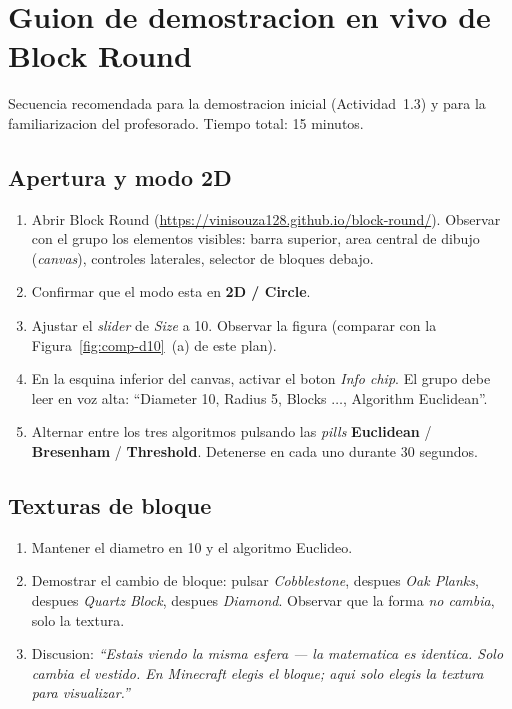 \documentclass[12pt,a4paper]{scrartcl}
\newcommand{\acc}[1]{\textcolor{accent}{\textbf{#1}}}
\begin{document}
\section{Guion de demostracion en vivo de Block Round}\label{ap:roteiro}

Secuencia recomendada para la demostracion inicial (Actividad~1.3) y para la familiarizacion del profesorado. Tiempo total: 15 minutos.

\subsection{Apertura y modo 2D}
\begin{enumerate}[leftmargin=1.5em,itemsep=0.15em,topsep=0.3em]
  \item Abrir Block Round (\url{https://vinisouza128.github.io/block-round/}). Observar con el grupo los elementos visibles: barra superior, area central de dibujo (\emph{canvas}), controles laterales, selector de bloques debajo.
  \item Confirmar que el modo esta en \acc{2D / Circle}.
  \item Ajustar el \emph{slider} de \emph{Size} a 10. Observar la figura (comparar con la Figura~\ref{fig:comp-d10}~(a) de este plan).
  \item En la esquina inferior del canvas, activar el boton \emph{Info chip}. El grupo debe leer en voz alta: \enquote{Diameter 10, Radius 5, Blocks $\dots$, Algorithm Euclidean}.
  \item Alternar entre los tres algoritmos pulsando las \emph{pills} \acc{Euclidean} / \acc{Bresenham} / \acc{Threshold}. Detenerse en cada uno durante 30 segundos.
\end{enumerate}

\subsection{Texturas de bloque}

\begin{enumerate}[leftmargin=1.5em,itemsep=0.15em,topsep=0.3em]
  \item Mantener el diametro en 10 y el algoritmo Euclideo.
  \item Demostrar el cambio de bloque: pulsar \emph{Cobblestone}, despues \emph{Oak Planks}, despues \emph{Quartz Block}, despues \emph{Diamond}. Observar que la forma \emph{no cambia}, solo la textura.
  \item Discusion: \emph{\enquote{Estais viendo la misma esfera --- la matematica es identica. Solo cambia el vestido. En Minecraft elegis el bloque; aqui solo elegis la textura para visualizar.}}
\end{enumerate}
\end{document}
